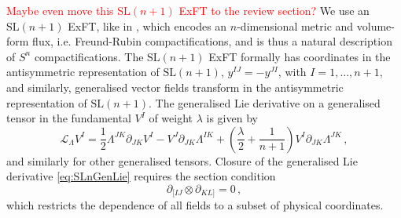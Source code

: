 \documentclass[a4paper, 11pt]{article}
\numberwithin{equation}{section}
\newcommand{\SL}[1]{\mathrm{SL}( #1 )}
\newcommand{\+}{\oplus}
\newcommand{\gL}{\mathcal{L}}
\newcommand{\EM}[1]{\textcolor{red}{#1}}
\begin{document}
\EM{Maybe even move this $\SL{n+1}$ ExFT to the review section?}
We use an $\SL{n+1}$ ExFT, like in \cite{Lee:2014mla}, which encodes an $n$-dimensional metric and volume-form flux, i.e. Freund-Rubin compactifications, and is thus a natural description of $S^n$ compactifications. The $\SL{n+1}$ ExFT formally has coordinates in the antisymmetric representation of $\SL{n+1}$, $y^{IJ} = - y^{JI}$, with $I = 1, \ldots, n+1$, and similarly, generalised vector fields transform in the antisymmetric representation of $\SL{n+1}$. The generalised Lie derivative on a generalised tensor in the fundamental $V^I$ of weight $\lambda$ is given by
\begin{equation} \label{eq:SLnGenLie}
	\gL_\Lambda V^I = \frac12 \Lambda^{JK} \partial_{JK} V^{I} - V^J \partial_{JK} \Lambda^{IK} + \left( \frac{\lambda}{2} + \frac{1}{n+1} \right) V^I \partial_{JK} \Lambda^{JK} \,,
\end{equation}
and similarly for other generalised tensors. Closure of the generalised Lie derivative \eqref{eq:SLnGenLie} requires the section condition
\begin{equation} \label{eq:SLnSC}
	\partial_{[IJ} \otimes \partial_{KL]} = 0 \,,
\end{equation}
which restricts the dependence of all fields to a subset of physical coordinates.
\end{document}
